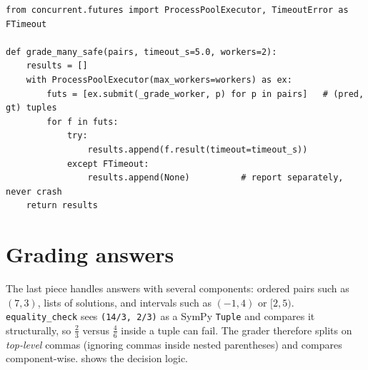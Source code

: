 \begin{lstlisting}[caption={Grading in a process pool with per-item timeouts.},label={lst:eval:safe}]
from concurrent.futures import ProcessPoolExecutor, TimeoutError as FTimeout

def grade_many_safe(pairs, timeout_s=5.0, workers=2):
    results = []
    with ProcessPoolExecutor(max_workers=workers) as ex:
        futs = [ex.submit(_grade_worker, p) for p in pairs]   # (pred, gt) tuples
        for f in futs:
            try:
                results.append(f.result(timeout=timeout_s))
            except FTimeout:
                results.append(None)          # report separately, never crash
    return results
\end{lstlisting}

\section{Grading answers}\label{sec:eval:grade}


The last piece handles answers with several components: ordered pairs such as $(7, 3)$, lists
of solutions, and intervals such as $(-1, 4)$ or $[2, 5)$. \texttt{equality\_check} sees
\texttt{(14/3, 2/3)} as a SymPy \texttt{Tuple} and compares it structurally, so $\tfrac{2}{3}$
versus $\tfrac{4}{6}$ inside a tuple can fail. The grader therefore splits on \emph{top-level}
commas (ignoring commas inside nested parentheses) and compares component-wise.
 shows the decision logic.

